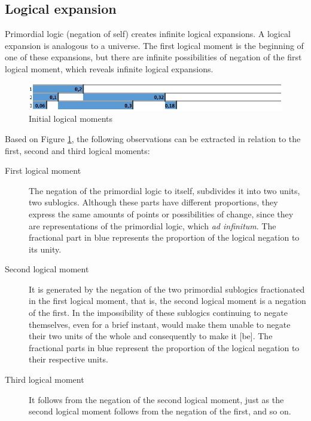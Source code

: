 \subsection{Logical expansion}
Primordial logic (negation of self) creates infinite logical expansions. A logical expansion is analogous to a universe. The first logical moment is the beginning of one of these expansions, but there are infinite possibilities of negation of the first logical moment, which reveals infinite logical expansions.
	\begin{figure}[H]
	\caption{Initial logical moments}
	\label{fig:third_logical_moment}
	\centering
	\includegraphics[scale=.75]{sections/images/third_logical_moment.jpg}
	\end{figure}

Based on Figure \ref{fig:third_logical_moment}, the following observations can be extracted in relation to the first, second and third logical moments:
	\begin{description}
	   \item[First logical moment] The negation of the primordial logic to itself, subdivides it into two units, two sublogics. Although these parts have different proportions, they express the same amounts of points or possibilities of change, since they are representations of the primordial logic, which \textit{ad infinitum}. The fractional part in blue represents the proportion of the logical negation to its unity.
	   \item[Second logical moment] It is generated by the negation of the two primordial sublogics fractionated in the first logical moment, that is, the second logical moment is a negation of the first. In the impossibility of these sublogics continuing to negate themselves, even for a brief instant, would make them unable to negate their two units of the whole and consequently to make it [be]. The fractional parts in blue represent the proportion of the logical negation to their respective units.
	   \item[Third logical moment] It follows from the negation of the second logical moment, just as the second logical moment follows from the negation of the first, and so on.
	\end{description}

